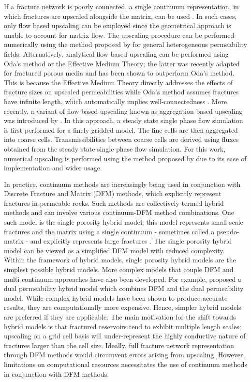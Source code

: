 \documentclass[draft]{agujournal2018}
\begin{document}
If a fracture network is poorly connected, a single continuum representation, in which fractures are upscaled alongside the matrix, can be used \citep{Berre2018a}. In such cases, only flow based upscaling can be employed since the geometrical approach is unable to account for matrix flow. The upscaling procedure can be performed numerically using the method proposed by \citet{Durlofsky1991} for general heterogeneous permeability fields. Alternatively, analytical flow based upscaling can be performed using Oda's method or the Effective Medium Theory; the latter was recently adapted for fractured porous media and has been shown to outperform Oda's method. This is because the Effective Medium Theory directly addresses the effects of fracture sizes on upscaled permeabilities while Oda's method assumes fractures have infinite length, which automatically implies well-connectedness \citep{Oda1985, Saevik2013, Saevik2014}. More recently, a variant of flow based upscaling known as aggregation based upscaling was introduced by \citet{Hui2017}. In this approach, a steady state single phase flow simulation is first performed for a finely gridded model. The fine cells are then aggregated into coarse cells. Transmissibilities between coarse cells are derived using fluxes obtained from the steady state single phase flow simulation. For this work, numerical upscaling is performed using the method proposed by \citet{Durlofsky1991} due to its ease of implementation and wider usage. 

In practice, continuum methods are increasingly being used in conjunction with Discrete Fracture and Matrix (DFM) methods, which explicitly represent fractures in permeable rocks. Such methods are collectively termed hybrid methods and can involve various continuum-DFM method combinations. One such model is the single porosity hybrid model; this model represents small scale fractures and the matrix using a single continuum - sometimes called a pseudo-matrix - and explicitly represents large fractures \citep{Lee2001, Li2008, Rogers2007}. The single porosity hybrid model can be viewed as a simplified DFM model with reduced complexity. Within the framework of hybrid models, single porosity hybrid models are the simplest possible hybrid models. More complex models that couple DFM and multi-continuum approaches have also been developed. For example, \citet{Jiang2015} proposed a dual permeability hybrid model which combines DFM and the dual permeability model. While complex hybrid models have been shown to produce accurate results, they are computationally more expensive. Hence, simpler hybrid models are preferred if they are applicable. The main motivation for the shift towards hybrid models is that fractured reservoirs tend to exhibit multiple length scales; upscaling on a grid cell basis will under-represent the highly conductive nature of fractures larger than the cell size. Ideally, full fracture network representation through DFM methods would circumvent errors arising from upscaling. However, limitations on computational resources necessitates the use of continuum methods in conjunction with DFM methods.
\end{document}

